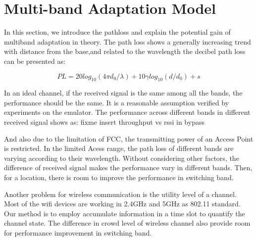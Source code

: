 \section{Multi-band Adaptation Model}
\label{sec:model}
In this section, we introduce the pathloss and explain the potential gain of multiband adaptation in theory. The path loss shows a generally increasing trend with distance from the base,and related to the wavelength the decibel path loss can be presented as:\cite{erceg1999empirically}

\begin{equation}
PL=20log_{10}(4\pi d_0/\lambda)+10\gamma log_{10}(d/d_0)+s
\end{equation}

In an ideal channel, if the received signal is the same among all the bands, the performance should be the same. It is a reasonable assumption verified by experiments on the emulator. The performance across different bands in different received signal shows as: {fixme insert throughput vs rssi in bypass}

And also due to the limitation of FCC, the transmitting power of an Access Point is restricted. In the limited Acess range, the path loss of different bands are varying according to their wavelength. Without considering other factors, the difference of received signal makes the performance vary in different bands. Then, for a location, there is room to improve the performance in switching band.

Another problem for wireless communication is the utility level of a channel. Most of the wifi devices are working in 2.4GHz and 5GHz as 802.11 standard. 
Our method is to employ accumulate information in a time slot to quantify the channel state. The difference in crowd level of wireless channel also provide room for performance improvement in switching band.  


